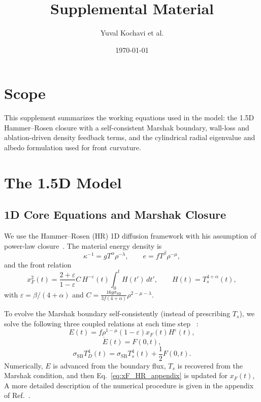 \documentclass[11pt]{article}
\title{Supplemental Material}
\author{Yuval Kochavi et al.}
\date{\today}
\begin{document}
\maketitle

\section*{Scope}
This supplement summarizes the working equations used in the model: the 1.5D Hammer--Rosen closure with a self-consistent Marshak boundary, wall-loss and ablation-driven density feedback terms, and the cylindrical radial eigenvalue and albedo formulation used for front curvature.

\section{The 1.5D Model}
\subsection{1D Core Equations and Marshak Closure}
We use the Hammer--Rosen (HR) 1D diffusion framework with his assumption of power-law closure~\cite{Hammer2003}. The material energy density is
\begin{equation}
\kappa^{-1}=gT^{\alpha}\rho^{-\lambda},
\qquad
e=fT^{\beta}\rho^{-\mu},
\end{equation}
and the front relation
\begin{equation}
x_F^2(t)=\frac{2+\varepsilon}{1-\varepsilon}C\,H^{-\varepsilon}(t)\int_0^t H(t')\,dt',
\qquad H(t)=T_s^{4+\alpha}(t),
\label{eq:xF_HR_appendix}
\end{equation}
with $\varepsilon=\beta/(4+\alpha)$ and $C=\frac{16g\sigma_{\mathrm{SB}}}{3f(4+\alpha)}\rho^{2-\mu-\lambda}$.

To evolve the Marshak boundary self-consistently (instead of prescribing $T_s$), we solve the following three coupled relations at each time step ~\cite{Cohen2018,Cohen2020Key}:
\begin{equation}
E(t)=f\rho^{1-\mu}(1-\varepsilon)x_F(t)H^{\varepsilon}(t),
\label{eq:E_HR_appendix}
\end{equation}
\begin{equation}
\dot E(t)=F(0,t),
\label{eq:dEdt_flux_appendix}
\end{equation}
\begin{equation}
\sigma_{\mathrm{SB}}T_D^4(t)=\sigma_{\mathrm{SB}}T_s^4(t)+\frac{1}{2}F(0,t).
\label{eq:marshak_bc_appendix}
\end{equation}
Numerically, $E$ is advanced from the boundary flux, $T_s$ is recovered from the Marshak condition, and then Eq.~\eqref{eq:xF_HR_appendix} is updated for $x_F(t)$, A more detailed description of the numerical procedure is given in the appendix of Ref.~\cite{Cohen2018}.
\end{document}
